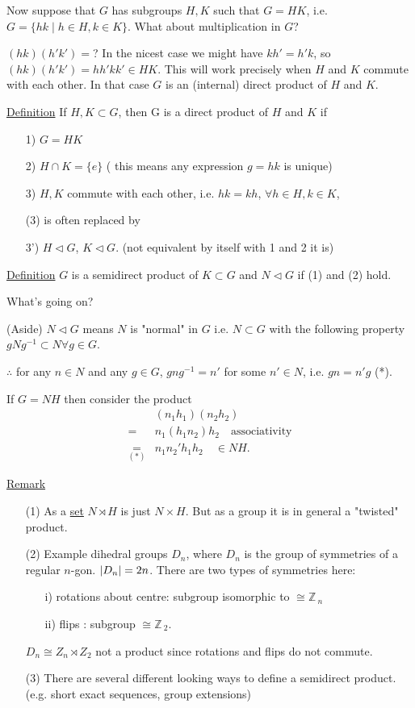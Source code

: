 \documentclass[12pt,a4paper]{article}
\newcommand{\zZ}{\ensuremath{\mathbb{Z}\,}}
\newcommand{\ul}[1]{\underline{#1}}
\begin{document}
Now suppose that $G$ has subgroups $H,K$ such that $G=HK$, i.e. $G=\{hk \mid h\in H, k\in K\}$. What about multiplication in $G$?

$(hk)(h'k')=$? In the nicest case we might have $kh'=h'k$, so $(hk)(h'k')=hh'kk' \in HK$. This will work precisely when $H$ and $K$ commute with each other. In that case $G$ is an (internal) direct product of $H$ and $K$.

\ul{Definition} If $H,K\subset G$, then G is a direct product of $H$ and $K$ if
\begin{itemize}
\item[1)] $G=HK$
\item[2)] $H\cap K =\{e\}$ ( this means any expression $g=hk$ is unique)
\item[3)] $H,K$ commute with each other, i.e. $hk=kh$, $\forall h\in H, k\in K$,

(3) is often replaced by
\item[3')] $H \lhd G$, $K\lhd G$. (not equivalent by itself with 1 and 2 it is)
\end{itemize}

\ul{Definition} $G$ is a semidirect product of $K\subset G$ and $N\lhd G$ if (1) and (2) hold.

What's going on?

(Aside) $N\lhd G$ means $N$ is "normal" in $G$ i.e. $N\subset G$ with the following property $gNg^{-1}\subset N \forall g\in G$.

$\therefore$ for any $n\in N$ and any $g\in G$, $gng^{-1}=n'$ for some $n'\in N$, i.e. $gn=n'g$ (*).

If $G=NH$ then consider the product 
\begin{align*}
& (n_1h_1)(n_2h_2)\\
=& n_1(h_1n_2)h_2 \quad \text{associativity}\\
\underset{(*)}{=}& n_1n_2' h_1 h_2 \quad \in NH.
\end{align*}

\ul{Remark}
\begin{itemize}
\item[(1)] As a \ul{set} $N\rtimes H$ is just $N\times H$. But as a group it is in general a "twisted" product.
\item[(2)] Example dihedral groups $D_n$, where $D_n$ is the group of symmetries of a regular $n$-gon. $\abs{D_n}=2n$. There are two types of symmetries here:
\begin{itemize}
\item[i)] rotations about centre: subgroup isomorphic to $\cong \zZ_n$
\item[ii)] flips : subgroup $\cong \zZ_2$.
\end{itemize}
$D_n\cong Z_n \rtimes Z_2$ not a product since rotations and flips do not commute.
\item[(3)] There are several different looking ways to define a semidirect product. (e.g. short exact sequences, group extensions)
\end{itemize}
\end{document}
